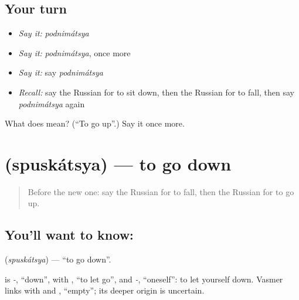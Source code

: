 \subsection*{Your turn}
\begin{itemize}
\raggedright
  \item \emph{Say it:} \emph{podnimátsya}
  \item \emph{Say it:} \emph{podnimátsya}, once more
  \item \emph{Say it:} say \emph{podnimátsya}
  \item \emph{Recall:} say the Russian for to sit down, then the Russian for to fall, then say \emph{podnimátsya} again
\end{itemize}

\begin{tcolorbox}[breakable,colback=teal!4,colframe=teal!35!black,title={Before you move on}]
What does  mean? (\textquotedblleft{}To go up\textquotedblright{}.) Say it once more.
\end{tcolorbox}
\section[\texorpdfstring{\ru{спускаться} (spuskátsya)}{спускаться (spuskátsya)}]{ (spuskátsya) — to go down}

\label{lesson:RU-C133-to-go-down}



\begin{quote}
Before the new one: say the Russian for to fall, then the Russian for to go up.
\end{quote}

\subsection*{You'll want to know: }
\textbf{} (\emph{spuskátsya}) — \textquotedblleft{}to go down\textquotedblright{}.

\begin{cousinweb}
\textbf{} is \emph{-}, \textquotedblleft{}down\textquotedblright{}, with \emph{}, \textquotedblleft{}to let go\textquotedblright{}, and \emph{-}, \textquotedblleft{}oneself\textquotedblright{}: to let yourself down. Vasmer links \emph{} with \emph{} and \emph{}, \textquotedblleft{}empty\textquotedblright{}; its deeper origin is uncertain.
\end{cousinweb}

